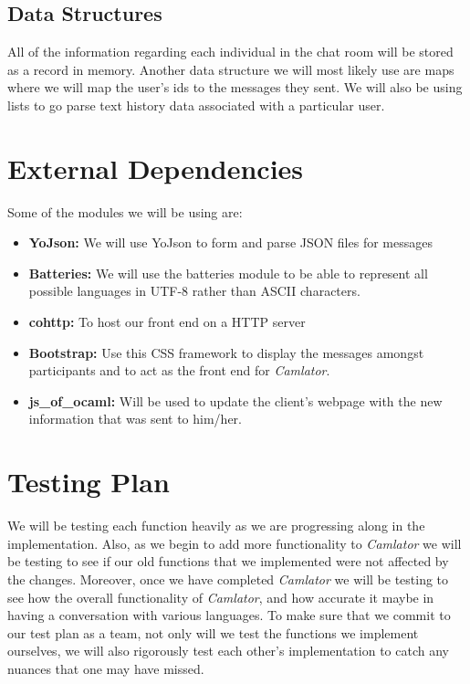 \documentclass[12pt, letterpaper]{article}
\begin{document}
\subsection{Data Structures} 
All of the information regarding each individual in the chat room will be stored as a record in memory. Another data structure we will most likely use are maps where we will map the user's ids to the messages they sent. We will also be using lists to go parse text history data associated with a particular user. 

\section{External Dependencies}
Some of the modules we will be using are: 
\begin{itemize}
\item \textbf{YoJson:} We will use YoJson to form and parse JSON files for messages
\item \textbf{Batteries:} We will use the batteries module to be able to represent all possible languages in UTF-8 rather than ASCII characters. 
\item \textbf{cohttp:} To host our front end on a HTTP server 
\item \textbf{Bootstrap:} Use this CSS framework to display the messages amongst participants and to act as the front end for \textit{Camlator}.
\item \textbf{js\_of\_ocaml:} Will be used to update the client's webpage with the new information that was sent to him/her.  
\end{itemize}

\section{Testing Plan}
We will be testing each function heavily as we are progressing along in the implementation. Also, as we begin to add more functionality to \textit{Camlator} we will be testing to see if our old functions that we implemented were not affected by the changes. Moreover, once we have completed \textit{Camlator} we will be testing to see how the overall functionality of \textit{Camlator}, and how accurate it maybe in having a conversation with various languages. To make sure that we commit to our test plan as a team, not only will we test the functions we implement ourselves, we will also rigorously test each other's implementation to catch any nuances that one may have missed. 
\end{document}
